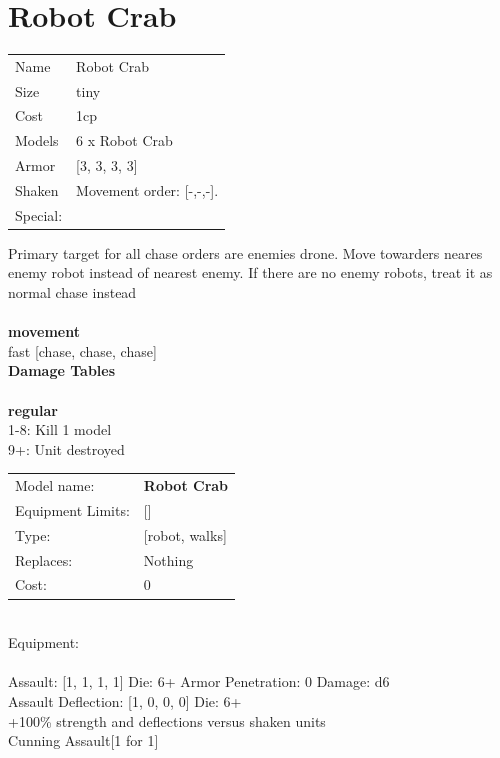 \ \\

\ \\
 
\ \\













\clearpage

\section{ Robot Crab }

\begin{tabular}{ll}
  Name & Robot Crab \\
  Size & tiny\\
  Cost & 1cp\\
  Models & 6 x Robot Crab\\
  Armor & [3, 3, 3, 3]\\
  Shaken & Movement order: [-,-,-].\\
  Special: \\
\end{tabular}

\noindent Primary target for all chase orders are enemies drone. Move towarders neares enemy robot instead of nearest enemy. If there are no enemy robots, treat it as normal chase instead\\ 


\ \\ {\bf movement } \\
fast [chase, chase, chase] \\


{\bf Damage Tables} \\
\ \\ {\bf regular } \\
1-8: Kill 1 model \\
9+: Unit destroyed \\


\noindent
\begin{tabular}{ll}
Model name: &{\bf Robot Crab } \\
Equipment Limits: &[] \\
Type: &[robot, walks] \\
Replaces: &Nothing \\
Cost: & 0\\
\end{tabular}
\ \\
Equipment:  \\
\ \\
Assault: [1, 1, 1, 1] Die: 6+ Armor Penetration: 0 Damage: d6 \\
Assault Deflection: [1, 0, 0, 0] Die: 6+\\
\indent +100\% strength and deflections versus shaken units\\ 
Cunning Assault[1 for 1]\\ 
 
